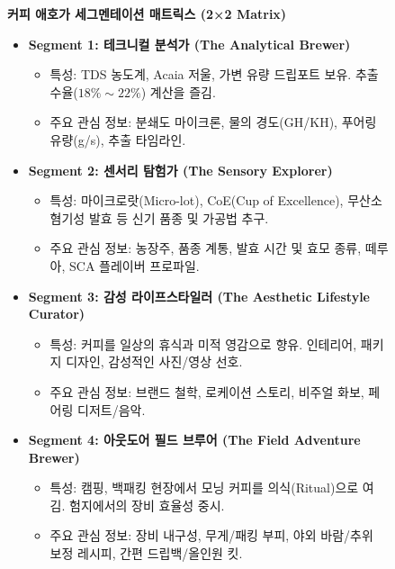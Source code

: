\documentclass[10pt,a4paper]{article}
\begin{document}
\begin{figure}[h!]
\centering
\begin{tcolorbox}[width=0.96\textwidth,colback=white,colframe=ForestGreen]
\textbf{\large 커피 애호가 세그멘테이션 매트릭스 (2×2 Matrix)}
\vspace{6pt}
\begin{itemize}[leftmargin=1.5em,itemsep=5pt]
    \item \textbf{Segment 1: 테크니컬 분석가 (The Analytical Brewer)}
    \begin{itemize}[itemsep=1pt]
        \item 특성: TDS 농도계, Acaia 저울, 가변 유량 드립포트 보유. 추출 수율($18\%\sim 22\%$) 계산을 즐김.
        \item 주요 관심 정보: 분쇄도 마이크론, 물의 경도(GH/KH), 푸어링 유량(g/s), 추출 타임라인.
    \end{itemize}
    \item \textbf{Segment 2: 센서리 탐험가 (The Sensory Explorer)}
    \begin{itemize}[itemsep=1pt]
        \item 특성: 마이크로랏(Micro-lot), CoE(Cup of Excellence), 무산소 혐기성 발효 등 신기 품종 및 가공법 추구.
        \item 주요 관심 정보: 농장주, 품종 계통, 발효 시간 및 효모 종류, 떼루아, SCA 플레이버 프로파일.
    \end{itemize}
    \item \textbf{Segment 3: 감성 라이프스타일러 (The Aesthetic Lifestyle Curator)}
    \begin{itemize}[itemsep=1pt]
        \item 특성: 커피를 일상의 휴식과 미적 영감으로 향유. 인테리어, 패키지 디자인, 감성적인 사진/영상 선호.
        \item 주요 관심 정보: 브랜드 철학, 로케이션 스토리, 비주얼 화보, 페어링 디저트/음악.
    \end{itemize}
    \item \textbf{Segment 4: 아웃도어 필드 브루어 (The Field Adventure Brewer)}
    \begin{itemize}[itemsep=1pt]
        \item 특성: 캠핑, 백패킹 현장에서 모닝 커피를 의식(Ritual)으로 여김. 험지에서의 장비 효율성 중시.
        \item 주요 관심 정보: 장비 내구성, 무게/패킹 부피, 야외 바람/추위 보정 레시피, 간편 드립백/올인원 킷.
    \end{itemize}
\end{itemize}
\end{tcolorbox}
\end{figure}
\end{document}
